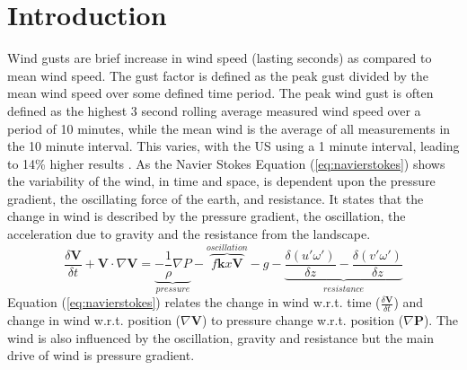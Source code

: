 
\chapter{Introduction} %

\label{Chapter1} %


\newcommand{\keyword}[1]{\textbf{#1}}
\newcommand{\tabhead}[1]{\textbf{#1}}
\newcommand{\code}[1]{\texttt{#1}}
\newcommand{\file}[1]{\texttt{\bfseries#1}}
\newcommand{\option}[1]{\texttt{\itshape#1}}

Wind gusts are brief increase in wind speed (lasting seconds) as compared to mean wind speed. The gust factor is defined as the peak gust divided by the mean wind speed over some defined time period. The peak wind gust is often defined as the highest 3 second rolling average measured wind speed over a period of 10 minutes, while the mean wind is the average of all measurements in the 10 minute interval. This varies, with the US using a 1 minute interval, leading to 14\% higher results \cite{why_wind_gusts}. As the Navier Stokes Equation (\ref{eq:navierstokes}) shows the variability of the wind, in time and space, is dependent upon the pressure gradient, the oscillating force of the earth, and resistance. It states that the change in wind is described by the pressure gradient, the oscillation, the acceleration due to gravity and the resistance from the landscape.
\begin{equation}
    \label{eq:navierstokes}
    \frac{\delta \mathbf{V}}{\delta t} + \mathbf{V}\cdot\nabla\mathbf{V} = \underbrace{-\frac{1}{\rho}\nabla P}_{pressure} -\overbrace{ f\mathbf{k}x\mathbf{V}}^{oscillation} - g - \underbrace{\frac{\delta(u'\omega')}{\delta z} - \frac{\delta(v'\omega')}{\delta z}}_{resistance}
\end{equation}
Equation (\ref{eq:navierstokes}) relates the change in wind w.r.t. time ($\frac{\delta \boldsymbol{V}}{\delta t}$) and change in wind w.r.t. position ($\nabla\boldsymbol{V}$) to pressure change w.r.t. position ($\nabla\boldsymbol{P}$). The wind is also influenced by the oscillation, gravity and resistance but the main drive of wind is pressure gradient\cite{uncertainties_in_numerical_weather_predictions}.


